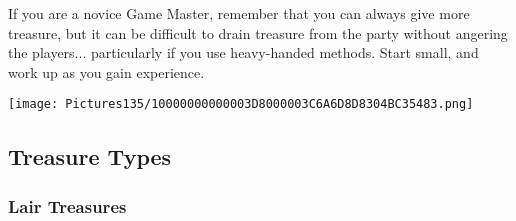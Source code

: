 \documentclass[a4paper,twoside,openany,10pt]{book}
\begin{document}
\begin{multicols}{2}
If you are a novice Game Master, remember that you can always give more treasure, but it can be difficult to drain treasure from the party without angering the players... particularly if you use heavy-handed methods. Start small, and work up as you gain experience. 

\begin{flushleft} \texttt{[image: Pictures135/10000000000003D8000003C6A6D8D8304BC35483.png]}  \end{flushleft}

\end{multicols}

\subsection{Treasure Types}\label{treasure-types}

\subsubsection{Lair Treasures}\label{lair-treasures}
\end{document}
